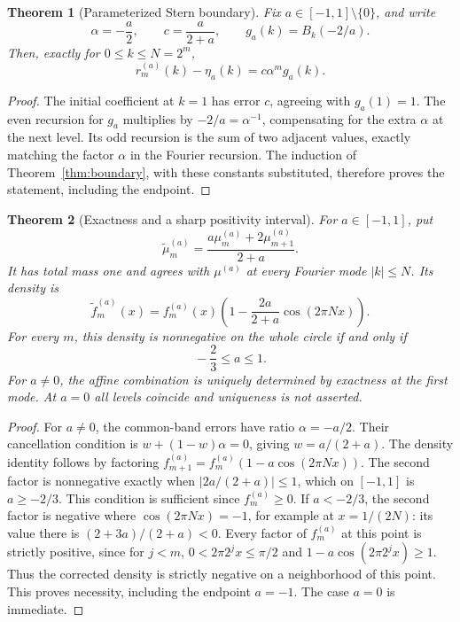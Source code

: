 \documentclass[11pt,a4paper]{article}
\numberwithin{equation}{section}
\newtheorem{theorem}{Theorem}[section]
\theoremstyle{definition}
\theoremstyle{remark}
\newcommand{\mt}{\widetilde\mu}
\newcommand{\ft}{\widetilde f}
\begin{document}
\begin{theorem}[Parameterized Stern boundary]
\label{thm:parameter-boundary}
Fix $a\in[-1,1]\setminus\{0\}$, and write
\begin{equation}
 \alpha=-\frac a2,\qquad c=\frac a{2+a},\qquad
 g_a(k)=B_k(-2/a).
 \label{eq:parameter-g}
\end{equation}
Then, exactly for $0\le k\le N=2^m$,
\begin{equation}
 r_m^{(a)}(k)-\eta_a(k)=c\alpha^m g_a(k).
 \label{eq:parameter-boundary}
\end{equation}
\end{theorem}
\begin{proof}
The initial coefficient at $k=1$ has error $c$, agreeing with $g_a(1)=1$.
The even recursion for $g_a$ multiplies by $-2/a=\alpha^{-1}$, compensating for
the extra $\alpha$ at the next level. Its odd recursion is the sum of two
adjacent values, exactly matching the factor $\alpha$ in the Fourier recursion.
The induction of Theorem~\ref{thm:boundary}, with these constants substituted,
therefore proves the statement, including the endpoint.
\end{proof}

\begin{theorem}[Exactness and a sharp positivity interval]
\label{thm:parameter-positive}
For $a\in[-1,1]$, put
\begin{equation}
 \mt_m^{(a)}=\frac{a\mu_m^{(a)}+2\mu_{m+1}^{(a)}}{2+a}.
 \label{eq:parameter-correction}
\end{equation}
It has total mass one and agrees with $\mu^{(a)}$ at every Fourier mode
$|k|\le N$. Its density is
\begin{equation}
 \ft_m^{(a)}(x)=f_m^{(a)}(x)
     \left(1-\frac{2a}{2+a}\cos(2\pi Nx)\right).
 \label{eq:parameter-density}
\end{equation}
For every $m$, this density is nonnegative on the whole circle if and only if
\begin{equation}
 \boxed{\qquad -\frac23\le a\le1.\qquad}
 \label{eq:positivity-threshold}
\end{equation}
For $a\ne0$, the affine combination is uniquely determined by exactness at the
first mode. At $a=0$ all levels coincide and uniqueness is not asserted.
\end{theorem}
\begin{proof}
For $a\ne0$, the common-band errors have ratio $\alpha=-a/2$. Their cancellation
condition is $w+(1-w)\alpha=0$, giving $w=a/(2+a)$. The density identity follows
by factoring $f_{m+1}^{(a)}=f_m^{(a)}(1-a\cos(2\pi Nx))$. The second factor is
nonnegative exactly when $|2a/(2+a)|\le1$, which on $[-1,1]$ is $a\ge-2/3$.
This condition is sufficient since $f_m^{(a)}\ge0$. If $a<-2/3$, the second
factor is negative where $\cos(2\pi Nx)=-1$, for example at $x=1/(2N)$:
its value there is $(2+3a)/(2+a)<0$. Every factor of $f_m^{(a)}$ at this point
is strictly positive, since for $j<m$,
$0<2\pi2^jx\le\pi/2$ and $1-a\cos(2\pi2^jx)\ge1$.
Thus the corrected density is strictly negative on a neighborhood of this point.
This proves necessity,
including the endpoint $a=-1$. The case $a=0$ is immediate.
\end{proof}
\end{document}
